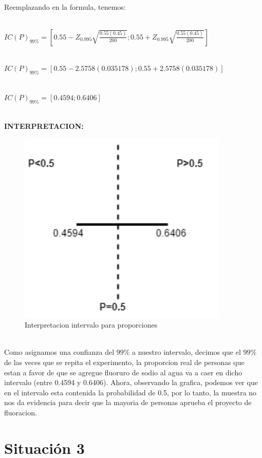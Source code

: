 \documentclass[letterpaper,12pt,onecolumn,titlepage]{article}
\begin{document}
~\\ Reemplazando en la formula, tenemos:

~\\ $IC(P)_{99\%}=\left[0.55-Z_{0.995}\sqrt{\frac{0.55(0.45)}{200}};0.55+Z_{0.995}\sqrt{\frac{0.55(0.45)}{200}}\right]$

~\\ $IC(P)_{99\%}=[0.55-2.5758(0.035178) ; 0.55+2.5758(0.035178)]$

~\\ $IC(P)_{99\%}=[0.4594 ; 0.6406]$

~\\ \textbf{INTERPRETACION:}
 \begin{figure}[!h]
    \begin{center}
        \includegraphics[width=10cm]{Figuras/Grafico1.png}
        \caption{Interpretacion intervalo para proporciones}
        \label{fig:Densidad}
    \end{center}
\end{figure}

~\\ Como asignamos una confianza del $99\%$ a nuestro intervalo, decimos que el $99\%$ de las veces que se repita el experimento, la proporcion real de personas que estan a favor de que se agregue fluoruro de sodio al agua va a caer en dicho intervalo (entre 0.4594 y 0.6406). Ahora, observando la grafica, podemos ver que en el intervalo esta contenida la probabilidad de 0.5, por lo tanto, la muestra no nos da evidencia para decir que la mayoria de personas aprueba el proyecto de fluoracion.

\pagebreak\section{Situaci\'{o}n 3}
\end{document}
